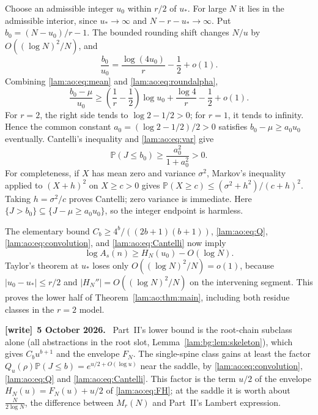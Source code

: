 \documentclass[11pt,a4paper]{article}
\numberwithin{equation}{section}
\theoremstyle{remark}
\newcommand{\Prob}{\mathbb P}
\newenvironment{writenote}[1][]{\par\smallskip\begingroup\small
 \noindent\textbf{[write]}\if\relax\detokenize{#1}\relax\else~\textbf{#1.}\fi\ }%
 {\par\endgroup\smallskip}
\begin{document}
Choose an admissible integer $u_0$ within $r/2$ of $u_*$. For large $N$ it lies in the admissible interior, since $u_*\to\infty$ and $N-r-u_*\to\infty$. Put $b_0=(N-u_0)/r-1$. The bounded rounding shift changes $N/u$ by $O((\log N)^2/N)$, and
\begin{equation}\label{lam:ao:eq:roundalpha}
 \frac{b_0}{u_0}=\frac{\log(4u_0)}r-\frac12+o(1).
\end{equation}
Combining \eqref{lam:ao:eq:mean} and \eqref{lam:ao:eq:roundalpha},
\[
 \frac{b_0-\mu}{u_0}\ge
 \left(\frac1r-\frac12\right)\log u_0+\frac{\log4}r-\frac12+o(1).
\]
For $r=2$, the right side tends to $\log2-1/2>0$; for $r=1$, it tends to infinity. Hence the common constant $a_0=(\log2-1/2)/2>0$ satisfies $b_0-\mu\ge a_0u_0$ eventually. Cantelli's inequality and \eqref{lam:ao:eq:var} give
\begin{equation}\label{lam:ao:eq:Cantelli}
 \Prob(J\le b_0)\ge\frac{a_0^2}{1+a_0^2}>0.
\end{equation}
For completeness, if $X$ has mean zero and variance $\sigma^2$, Markov's inequality applied to $(X+h)^2$ on $X\ge c>0$ gives
$\Prob(X\ge c)\le(\sigma^2+h^2)/(c+h)^2$. Taking $h=\sigma^2/c$ proves Cantelli; zero variance is immediate. Here $\{J>b_0\}\subseteq\{J-\mu\ge a_0u_0\}$, so the integer endpoint is harmless.

The elementary bound $C_b\ge4^b/((2b+1)(b+1))$, \eqref{lam:ao:eq:Q}, \eqref{lam:ao:eq:convolution}, and \eqref{lam:ao:eq:Cantelli} now imply
\[
 \log A_s(n)\ge H_N(u_0)-O(\log N).
\]
Taylor's theorem at $u_*$ loses only $O((\log N)^2/N)=o(1)$, because $|u_0-u_*|\le r/2$ and $|H_N''|=O((\log N)^2/N)$ on the intervening segment. This proves the lower half of Theorem~\ref{lam:ao:thm:main}, including both residue classes in the $r=2$ model.
\begin{writenote}[5 October 2026]
Part~II's lower bound is the root-chain subclass alone (all abstractions in the root slot, Lemma~\ref{lam:bg:lem:skeleton}), which gives $C_bu^{b+1}$ and the envelope $F_N$. The single-spine class gains at least the factor $Q_u(\rho)\Prob(J\le b)=e^{u/2+O(\log u)}$ near the saddle, by \eqref{lam:ao:eq:convolution}, \eqref{lam:ao:eq:Q} and \eqref{lam:ao:eq:Cantelli}. This factor is the term $u/2$ of the envelope $H_N(u)=F_N(u)+u/2$ of \eqref{lam:ao:eq:FH}; at the saddle it is worth about $\frac N{2\log N}$, the difference between $M_r(N)$ and Part~II's Lambert expression.
\end{writenote}
\end{document}
